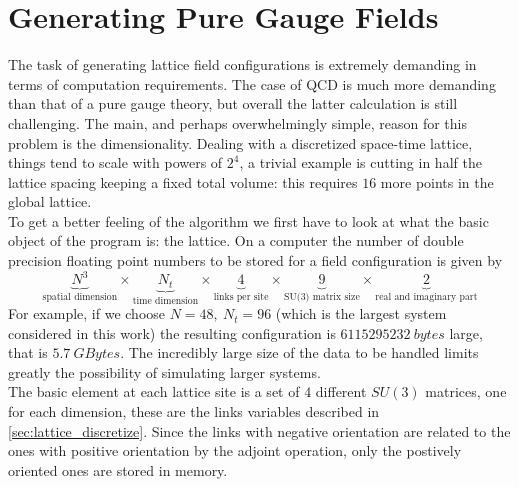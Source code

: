 \section{Generating Pure Gauge Fields}
The task of generating lattice field configurations is extremely demanding in terms of computation requirements. The case of QCD is much more demanding than that of a pure gauge theory, but overall the latter calculation is still challenging. The main, and perhaps overwhelmingly simple, reason for this problem is the dimensionality. Dealing with a discretized space-time lattice, things tend to scale with powers of $2^4$, a trivial example is cutting in half the lattice spacing keeping a fixed total volume: this requires $16$ more points in the global lattice. \\
To get a better feeling of the algorithm we first have to look at what the basic object of the program is: the lattice. On a computer the number of double precision floating point numbers to be stored for a field configuration is given by
\begin{equation}
    \underbrace{N^3}_\text{spatial dimension} \times
    \underbrace{N_t}_\text{time dimension} \times
    \underbrace{4}_\text{links per site} \times 
    \underbrace{9}_\text{SU(3) matrix size} \times
    \underbrace{2}_\text{real and imaginary part}
\end{equation}
For example, if we choose $N=48,~N_t=96$ (which is the largest system considered in this work) the resulting configuration is $6115295232~bytes$ large, that is $5.7~GBytes$.  The incredibly large size of the data to be handled limits greatly the possibility of simulating larger systems. \\
The basic element at each lattice site is a set of $4$ different $SU(3)$ matrices, one for each dimension, these are the links variables described in \cref{sec:lattice_discretize}. Since the links with negative orientation are related to the ones with positive orientation by the adjoint operation, only the postively oriented ones are stored in memory.  

